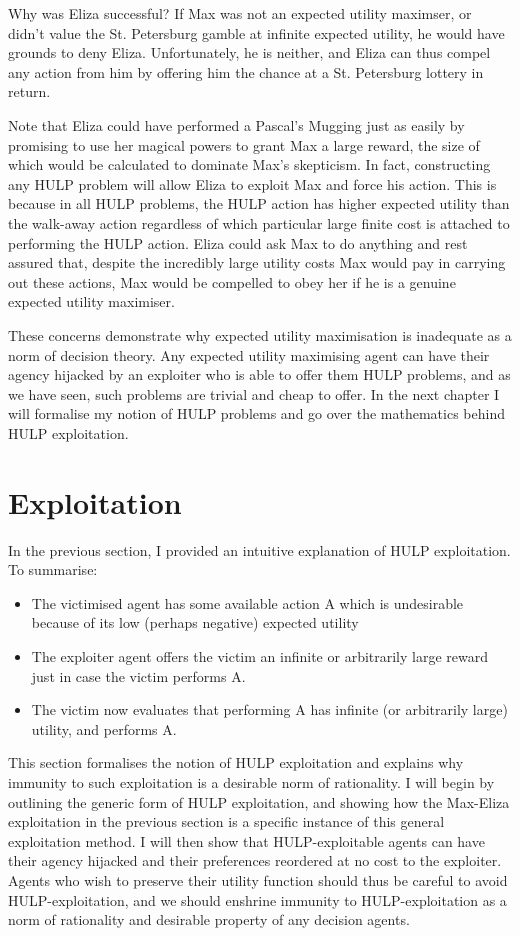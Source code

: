 \documentclass{article}
\begin{document}
Why was Eliza successful? If Max was not an expected utility maximser, or didn't value the St. Petersburg gamble at infinite expected utility, he would have grounds to deny Eliza. Unfortunately, he is neither, and Eliza can thus compel any action from him by offering him the chance at a St. Petersburg lottery in return. 

Note that Eliza could have performed a Pascal's Mugging just as easily by promising to use her magical powers to grant Max a large reward, the size of which would be calculated to dominate Max's skepticism. In fact, constructing any HULP problem will allow Eliza to exploit Max and force his action. This is because in all HULP problems, the HULP action has higher expected utility than the walk-away action regardless of which particular large finite cost is attached to performing the HULP action. Eliza could ask Max to do anything and rest assured that, despite the incredibly large utility costs Max would pay in carrying out these actions, Max would be compelled to obey her if he is a genuine expected utility maximiser.

These concerns demonstrate why expected utility maximisation is inadequate as a norm of decision theory. Any expected utility maximising agent can have their agency hijacked by an exploiter who is able to offer them HULP problems, and as we have seen, such problems are trivial and cheap to offer. In the next chapter I will formalise my notion of HULP problems and go over the mathematics behind HULP exploitation.

\section{Exploitation}

In the previous section, I provided an intuitive explanation of HULP exploitation. To summarise:

\begin{itemize}
\item The victimised agent has some available action A which is undesirable because of its low (perhaps negative) expected utility
\item The exploiter agent offers the victim an infinite or arbitrarily large reward just in case the victim performs A. 
\item The victim now evaluates that performing A has infinite (or arbitrarily large) utility, and performs A.
\end{itemize}

This section formalises the notion of HULP exploitation and explains why immunity to such exploitation is a desirable norm of rationality. I will begin by outlining the generic form of HULP exploitation, and showing how the Max-Eliza exploitation in the previous section is a specific instance of this general exploitation method. I will then show that HULP-exploitable agents can have their agency hijacked and their preferences reordered at no cost to the exploiter. Agents who wish to preserve their utility function should thus be careful to avoid HULP-exploitation, and we should enshrine immunity to HULP-exploitation as a norm of rationality and desirable property of any decision agents.
\end{document}
